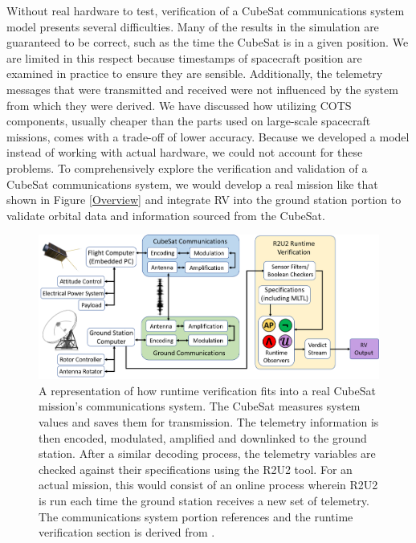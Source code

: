 \documentclass[conf]{new-aiaa}
\begin{document}
Without real hardware to test, verification of a CubeSat communications system model presents several difficulties. Many of the results in the simulation are guaranteed to be correct, such as the time the CubeSat is in a given position. We are limited in this respect because timestamps of spacecraft position are examined in practice to ensure they are sensible. Additionally, the telemetry messages that were transmitted and received were not influenced by the system from which they were derived. We have discussed how utilizing COTS components, usually cheaper than the parts used on large-scale spacecraft missions, comes with a trade-off of lower accuracy. Because we developed a model instead of working with actual hardware, we could not account for these problems. To comprehensively explore the verification and validation of a CubeSat communications system, we would develop a real mission like that shown in Figure \ref{Overview} and integrate RV into the ground station portion to validate orbital data and information sourced from the CubeSat.

\begin{figure}[!ht]
\centering
\includegraphics[width=1\textwidth]{Fig/InFlight_Overview.png}
\caption{A representation of how runtime verification fits into a real CubeSat mission's communications system. The CubeSat measures system values and saves them for transmission. The telemetry information is then encoded, modulated, amplified and downlinked to the ground station. After a similar decoding process, the telemetry variables are checked against their specifications using the R2U2 tool. For an actual mission, this would consist of an online process wherein R2U2 is run each time the ground station receives a new set of telemetry. The communications system portion references \cite{Asundi2013} and the runtime verification section is derived from \cite{ARS17}.}
\label{CubeSatRVDiagram}
\end{figure}
\end{document}
